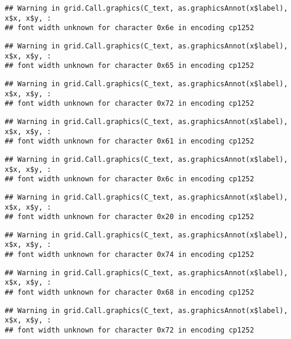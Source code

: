 \documentclass[
]{article}
\begin{document}
\begin{verbatim}
## Warning in grid.Call.graphics(C_text, as.graphicsAnnot(x$label), x$x, x$y, :
## font width unknown for character 0x6e in encoding cp1252
\end{verbatim}

\begin{verbatim}
## Warning in grid.Call.graphics(C_text, as.graphicsAnnot(x$label), x$x, x$y, :
## font width unknown for character 0x65 in encoding cp1252
\end{verbatim}

\begin{verbatim}
## Warning in grid.Call.graphics(C_text, as.graphicsAnnot(x$label), x$x, x$y, :
## font width unknown for character 0x72 in encoding cp1252
\end{verbatim}

\begin{verbatim}
## Warning in grid.Call.graphics(C_text, as.graphicsAnnot(x$label), x$x, x$y, :
## font width unknown for character 0x61 in encoding cp1252
\end{verbatim}

\begin{verbatim}
## Warning in grid.Call.graphics(C_text, as.graphicsAnnot(x$label), x$x, x$y, :
## font width unknown for character 0x6c in encoding cp1252
\end{verbatim}

\begin{verbatim}
## Warning in grid.Call.graphics(C_text, as.graphicsAnnot(x$label), x$x, x$y, :
## font width unknown for character 0x20 in encoding cp1252
\end{verbatim}

\begin{verbatim}
## Warning in grid.Call.graphics(C_text, as.graphicsAnnot(x$label), x$x, x$y, :
## font width unknown for character 0x74 in encoding cp1252
\end{verbatim}

\begin{verbatim}
## Warning in grid.Call.graphics(C_text, as.graphicsAnnot(x$label), x$x, x$y, :
## font width unknown for character 0x68 in encoding cp1252
\end{verbatim}

\begin{verbatim}
## Warning in grid.Call.graphics(C_text, as.graphicsAnnot(x$label), x$x, x$y, :
## font width unknown for character 0x72 in encoding cp1252
\end{verbatim}
\end{document}
